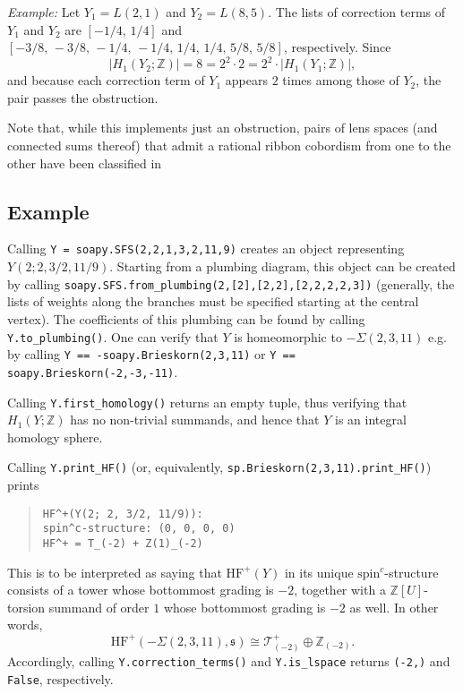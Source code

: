 \documentclass[12pt]{amsart}
\theoremstyle{definition}
\theoremstyle{remark}
\numberwithin{equation}{section}
\newcommand{\hfp}{\mathrm{HF}^{+}}
\newcommand{\Z}{\mathbb{Z}}
\begin{document}
\emph{Example:} Let $Y_{1}=L(2,1)$ and $Y_{2}=L(8,5)$.
The lists of correction terms of $Y_{1}$ and $Y_{2}$ are $[-1/4,\,1/4]$ and $[-3/8,\,-3/8,\,-1/4,\,-1/4,\,1/4,\,1/4,\,5/8,\,5/8]$, respectively.
Since \[|H_{1}(Y_{2};\mathbb{Z})|=8=2^{2}\cdot 2=2^{2}\cdot|H_{1}(Y_{1};\mathbb{Z})|,\] and because each correction term of $Y_{1}$ appears $2$ times among those of $Y_{2}$, the pair passes the obstruction.

Note that, while this implements just an obstruction, pairs of lens spaces (and connected sums thereof) that admit a rational ribbon cobordism from one to the other have been classified in \cite{Huber}

\subsection*{Example}
Calling \texttt{Y = soapy.SFS(2,2,1,3,2,11,9)} creates an object representing $Y(2;2,3/2,11/9)$. Starting from a plumbing diagram, this object can be created by calling \texttt{soapy.SFS.from\_plumbing(2,[2],[2,2],[2,2,2,2,3])} (generally, the lists of weights along the branches must be specified starting at the central vertex).
The coefficients of this plumbing can be found by calling \texttt{Y.to\_plumbing()}.
One can verify that $Y$ is homeomorphic to $-\Sigma(2,3,11)$ e.g. by calling \texttt{Y == -soapy.Brieskorn(2,3,11)} or \texttt{Y == soapy.Brieskorn(-2,-3,-11)}.

Calling \texttt{Y.first\_homology()} returns an empty tuple, thus verifying that $H_{1}(Y;\Z)$ has no non-trivial summands, and hence that $Y$ is an integral homology sphere.

Calling \texttt{Y.print\_HF()} (or, equivalently, \texttt{sp.Brieskorn(2,3,11).print\_HF()}) prints 
\begin{quote}
\texttt{HF\^{}+(Y(2; 2, 3/2, 11/9)):\\
spin\^{}c-structure: (0, 0, 0, 0)\\
HF\^{}+ = T\_(-2) + Z(1)\_(-2)}
\end{quote}
This is to be interpreted as saying that $\hfp(Y)$ in its unique $\text{spin}^{c}$-structure consists of a tower whose bottommost grading is $-2$, together with a $\Z[U]$-torsion summand of order $1$ whose bottommost grading is $-2$ as well.
In other words, \[\hfp(-\Sigma(2,3,11),\mathfrak{s})\cong\mathcal{T}_{(-2)}^{+}\oplus\Z_{(-2)}.\]
Accordingly, calling \texttt{Y.correction\_terms()} and \texttt{Y.is\_lspace} returns \texttt{(-2,)} and \texttt{False}, respectively.




\end{document}
